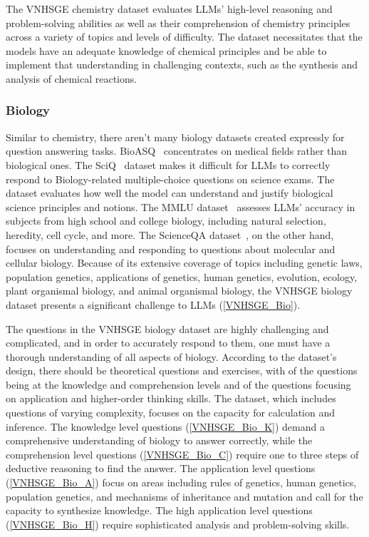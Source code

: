 \documentclass{article}
\begin{document}
{	The VNHSGE chemistry dataset evaluates LLMs' high-level reasoning and problem-solving abilities as well as their comprehension of chemistry principles across a variety of topics and levels of difficulty. The dataset necessitates that the models have an adequate knowledge of chemical principles and be able to implement that understanding in challenging contexts, such as the synthesis and analysis of chemical reactions.
	
	\subsubsection{Biology}
	
	Similar to chemistry, there aren't many biology datasets created expressly for question answering tasks. BioASQ~\cite{tsatsaronis2015overview} concentrates on medical fields rather than biological ones. The SciQ~\cite{welbl2017crowdsourcing} dataset makes it difficult for LLMs to correctly respond to Biology-related multiple-choice questions on science exams. The dataset evaluates how well the model can understand and justify biological science principles and notions. The MMLU dataset~\cite{hendrycks2020measuring} assesses LLMs' accuracy in subjects from high school and college biology, including natural selection, heredity, cell cycle, and more. The ScienceQA dataset~\cite{lu2022learn}, on the other hand, focuses on understanding and responding to questions about molecular and cellular biology. Because of its extensive coverage of topics including genetic laws, population genetics, applications of genetics, human genetics, evolution, ecology, plant organismal biology, and animal organismal biology, the VNHSGE biology dataset presents a significant challenge to LLMs (\ref{VNHSGE_Bio}). 
	
	The questions in the VNHSGE biology dataset are highly challenging and complicated, and in order to accurately respond to them, one must have a thorough understanding of all aspects of biology. According to the dataset's design, there should be  theoretical questions and  exercises, with  of the questions being at the knowledge and comprehension levels and  of the questions focusing on application and higher-order thinking skills. The dataset, which includes questions of varying complexity, focuses on the capacity for calculation and inference. The knowledge level questions (\ref{VNHSGE_Bio_K}) demand a comprehensive understanding of biology to answer correctly, while the comprehension level questions (\ref{VNHSGE_Bio_C}) require one to three steps of deductive reasoning to find the answer. The application level questions (\ref{VNHSGE_Bio_A}) focus on areas including rules of genetics, human genetics, population genetics, and mechanisms of inheritance and mutation and call for the capacity to synthesize knowledge. The high application level questions (\ref{VNHSGE_Bio_H}) require sophisticated analysis and problem-solving skills.
	
}
\end{document}
